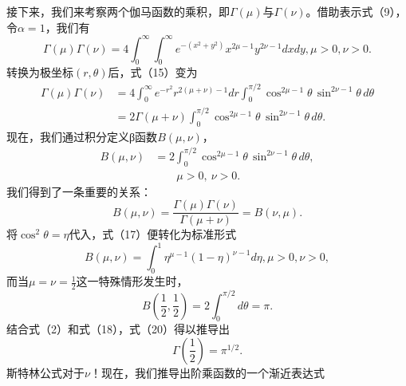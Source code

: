 接下来，我们来考察两个伽马函数的乘积，即\(\Gamma(\mu)\)与\(\Gamma(\nu)\)。借助表示式（9），令\(\alpha=1\)，我们有
\begin{equation}\tag{17.2.16}\label{eq:17.2.16}
\Gamma ( \mu ) \Gamma ( \nu ) = 4 \int _ { 0 } ^{\infty} \int _ { 0 } ^{\infty} e ^{- ( x ^ { 2} + y ^{2} ) } x ^{2 \mu - 1} y ^{2 \nu - 1} d x d y ,  \mu > 0 , \nu > 0 .
\end{equation}
转换为极坐标\((r, \theta)\)后，式（15）变为
\begin{equation}\tag{17.2.17}\label{eq:17.2.17}
\begin{aligned}
\Gamma(\mu)\Gamma(\nu)
&= 4\int_0^{\infty} e^{-r^2}r^{2(\mu+\nu)-1}dr
\int_0^{\pi/2}\cos^{2\mu-1}\theta\,\sin^{2\nu-1}\theta\,d\theta \\
&= 2\Gamma(\mu+\nu)\int_0^{\pi/2}\cos^{2\mu-1}\theta\,\sin^{2\nu-1}\theta\,d\theta.
\end{aligned}
\end{equation}
现在，我们通过积分定义β函数\(B(\mu, \nu)\)，
\begin{equation}\tag{17.2.18}\label{eq:17.2.18}
\begin{aligned}
B(\mu,\nu)&=2\int_0^{\pi/2}\cos^{2\mu-1}\theta\,\sin^{2\nu-1}\theta\,d\theta,\\
&\qquad \mu>0,\ \nu>0.
\end{aligned}
\end{equation}
我们得到了一条重要的关系：
\begin{equation}\tag{17.2.19}\label{eq:17.2.19}
B ( \mu , \nu ) = \frac { \Gamma ( \mu ) \Gamma ( \nu ) } { \Gamma ( \mu + \nu ) } = B ( \nu , \mu ) .
\end{equation}
将\(\cos^{2}\theta=\eta\)代入，式（17）便转化为标准形式
\begin{equation}\tag{17.2.20}\label{eq:17.2.20}
B ( \mu , \nu ) = \int _ { 0 } ^{1} \eta ^{\mu - 1} ( 1 - \eta ) ^{\nu - 1} d \eta ,  \mu > 0 , \nu > 0 ,
\end{equation}
而当\(\mu=\nu=\frac{1}{2}\)这一特殊情形发生时，
\begin{equation}\tag{17.2.21}\label{eq:17.2.21}
B \left( \frac { 1 } { 2 } , \frac { 1 } { 2 } \right) = 2 \int _ { 0 } ^{\pi / 2} d \theta = \pi .
\end{equation}
结合式（2）和式（18），式（20）得以推导出
\begin{equation}\tag{17.2.22}\label{eq:17.2.22}
\Gamma \left( \frac { 1 } { 2 } \right) = \pi ^{1 / 2} .
\end{equation}
斯特林公式对于\(\nu\)！现在，我们推导出阶乘函数的一个渐近表达式
